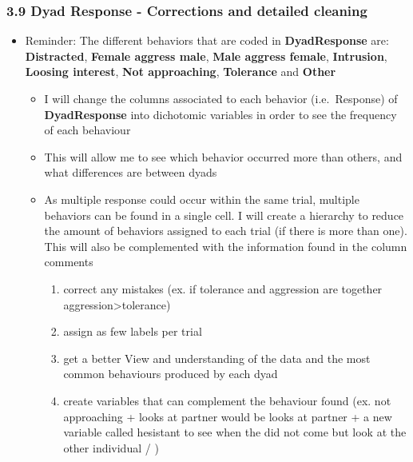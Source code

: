 \documentclass[
]{article}
\providecommand{\tightlist}{%
  \setlength{\itemsep}{0pt}\setlength{\parskip}{0pt}}
\begin{document}
\hypertarget{dyad-response---corrections-and-detailed-cleaning}{%
\subsubsection{3.9 Dyad Response - Corrections and detailed
cleaning}\label{dyad-response---corrections-and-detailed-cleaning}}

\begin{itemize}
\item
  Reminder: The different behaviors that are coded in
  \textbf{DyadResponse} are: \textbf{Distracted}, \textbf{Female aggress
  male}, \textbf{Male aggress female}, \textbf{Intrusion},
  \textbf{Loosing interest}, \textbf{Not approaching},
  \textbf{Tolerance} and \textbf{Other}

  \begin{itemize}
  \tightlist
  \item
    I will change the columns associated to each behavior
    (i.e.~Response) of \textbf{DyadResponse} into dichotomic variables
    in order to see the frequency of each behaviour
  \item
    This will allow me to see which behavior occurred more than others,
    and what differences are between dyads
  \item
    As multiple response could occur within the same trial, multiple
    behaviors can be found in a single cell. I will create a hierarchy
    to reduce the amount of behaviors assigned to each trial (if there
    is more than one). This will also be complemented with the
    information found in the column comments

    \begin{enumerate}
    \def\labelenumi{\arabic{enumi}.}
    \tightlist
    \item
      correct any mistakes (ex. if tolerance and aggression are together
      aggression\textgreater tolerance)
    \item
      assign as few labels per trial
    \item
      get a better View and understanding of the data and the most
      common behaviours produced by each dyad
    \item
      create variables that can complement the behaviour found (ex. not
      approaching + looks at partner would be looks at partner + a new
      variable called hesistant to see when the did not come but look at
      the other individual / )
    \end{enumerate}


\end{itemize}
\end{itemize}
\end{document}
